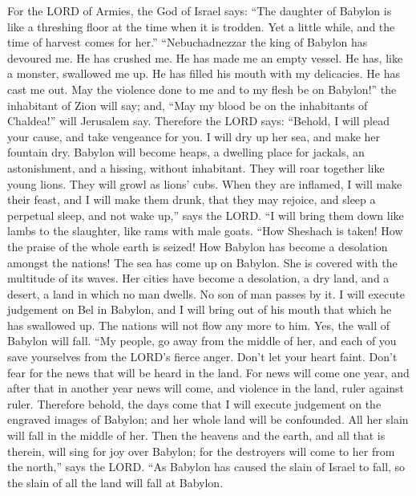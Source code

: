  For the LORD of Armies, the God of Israel says: ``The
daughter of Babylon is like a threshing floor at the time when it is
trodden. Yet a little while, and the time of harvest comes for her.''
 ``Nebuchadnezzar the king of Babylon has devoured me. He
has crushed me. He has made me an empty vessel. He has, like a monster,
swallowed me up. He has filled his mouth with my delicacies. He has cast
me out.  May the violence done to me and to my flesh be on
Babylon!'' the inhabitant of Zion will say; and, ``May my blood be on
the inhabitants of Chaldea!'' will Jerusalem say. 
Therefore the LORD says: ``Behold, I will plead your cause, and take
vengeance for you. I will dry up her sea, and make her fountain dry.
 Babylon will become heaps, a dwelling place for jackals,
an astonishment, and a hissing, without inhabitant.  They
will roar together like young lions. They will growl as lions' cubs.
 When they are inflamed, I will make their feast, and I
will make them drunk, that they may rejoice, and sleep a perpetual
sleep, and not wake up,'' says the LORD.  ``I will bring
them down like lambs to the slaughter, like rams with male goats.
 ``How Sheshach is taken! How the praise of the whole earth
is seized! How Babylon has become a desolation amongst the nations!
 The sea has come up on Babylon. She is covered with the
multitude of its waves.  Her cities have become a
desolation, a dry land, and a desert, a land in which no man dwells. No
son of man passes by it.  I will execute judgement on Bel
in Babylon, and I will bring out of his mouth that which he has
swallowed up. The nations will not flow any more to him. Yes, the wall
of Babylon will fall.  ``My people, go away from the middle
of her, and each of you save yourselves from the LORD's fierce anger.
 Don't let your heart faint. Don't fear for the news that
will be heard in the land. For news will come one year, and after that
in another year news will come, and violence in the land, ruler against
ruler.  Therefore behold, the days come that I will execute
judgement on the engraved images of Babylon; and her whole land will be
confounded. All her slain will fall in the middle of her. 
Then the heavens and the earth, and all that is therein, will sing for
joy over Babylon; for the destroyers will come to her from the north,''
says the LORD.  ``As Babylon has caused the slain of Israel
to fall, so the slain of all the land will fall at Babylon.
